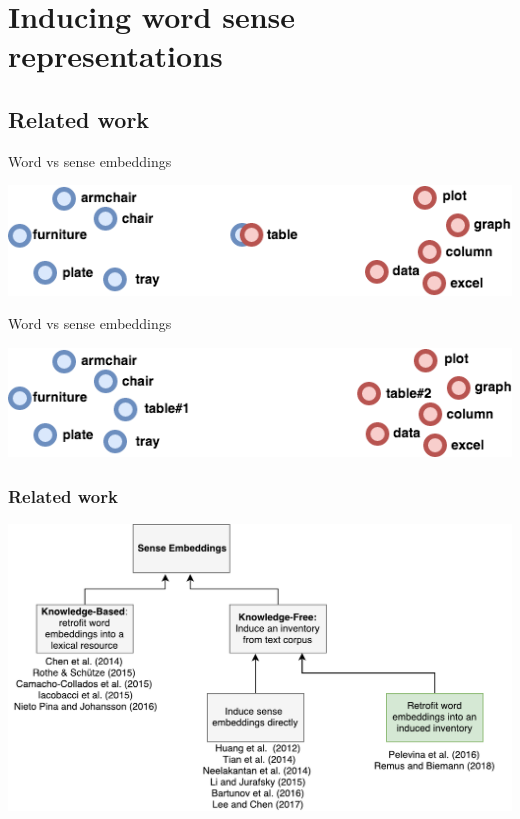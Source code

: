 
\section{Inducing word sense representations}


\subsection{Related work}

\begin{frame}{Word vs sense embeddings}

\begin{center}
	\includegraphics[width=1.0\textwidth]{table-ambigous}
\end{center}	
\end{frame}

\begin{frame}{Word vs sense embeddings}

\begin{center}
	\includegraphics[width=1.0\textwidth]{table-unambigous}
\end{center}	
\end{frame}


\begin{frame}[fragile]
\frametitle{Related work}
\begin{center}
 \includegraphics[height=0.56\textwidth]{sense_embeddings}
 \end{center}
\end{frame}


